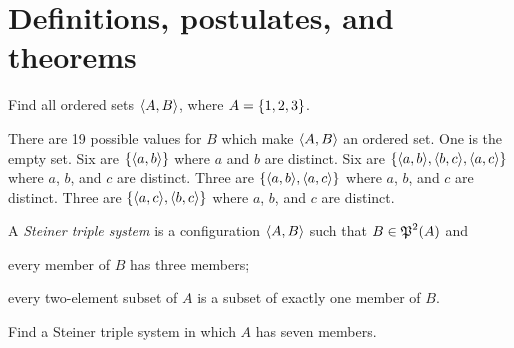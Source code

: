 \section{Definitions, postulates, and theorems}
\begin{exercise}
Find all ordered sets $\left\langle A,B\right\rangle$, where $A = \left\{1, 2, 3\right\}$.
\end{exercise}

\begin{solution}
There are 19 possible values for $B$ which make $\left\langle A,B\right\rangle$ an ordered set.
One is the empty set.
Six are $\left\{\left\langle a,b\right\rangle\right\}$ where $a$ and $b$ are distinct.
Six are $\set{\aprn{a,b},\aprn{b,c},\aprn{a,c}}$ where $a$, $b$, and $c$ are distinct.
Three are $\set{\aprn{a,b},\aprn{a,c}}$ where $a$, $b$, and $c$ are distinct.
Three are $\set{\aprn{a,c},\aprn{b,c}}$ where $a$, $b$, and $c$ are distinct.
\end{solution}

\begin{exercise}
A \textit{Steiner triple system} is a configuration $\left\langle A, B\right\rangle$ such that $B\in\operatorname{\mathfrak{P}}^2(A)$ and
\begin{enumalpha}
    \item every member of $B$ has three members;
    \item every two-element subset of $A$ is a subset of exactly one member of $B$.
\end{enumalpha}
Find a Steiner triple system in which $A$ has seven members.
\end{exercise}

